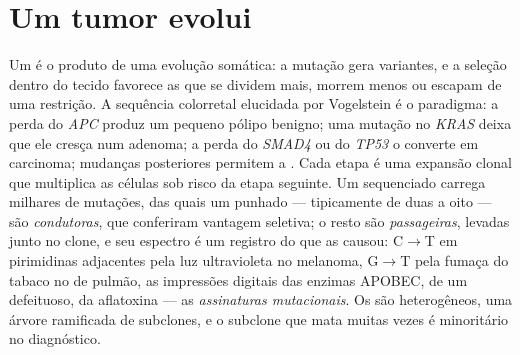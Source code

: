 \section{Um tumor evolui}

\begin{proposition}\label{prop:b3:cancer-biology:multistep}
Um  é o produto de uma evolução somática: a mutação gera
variantes, e a seleção dentro do tecido favorece as que se dividem
mais, morrem menos ou escapam de uma restrição. A sequência colorretal
elucidada por Vogelstein é o paradigma: a perda do \emph{APC} produz um
pequeno pólipo benigno; uma mutação no \emph{KRAS} deixa que ele cresça
num adenoma; a perda do \emph{SMAD4} ou do \emph{TP53} o converte em
carcinoma; mudanças posteriores permitem a . Cada etapa é uma
expansão clonal que multiplica as células sob risco da etapa seguinte.
Um  sequenciado carrega milhares de mutações, das quais um punhado
--- tipicamente de duas a oito --- são \emph{condutoras}, que
conferiram vantagem seletiva; o resto são \emph{passageiras}, levadas
junto no clone, e seu espectro é um registro do que as causou: C$\to$T
em pirimidinas adjacentes pela luz ultravioleta no melanoma, G$\to$T
pela fumaça do tabaco no  de pulmão, as impressões digitais das
enzimas APOBEC, de um  defeituoso, da
aflatoxina --- as \emph{assinaturas mutacionais}. Os  são
heterogêneos, uma árvore ramificada de subclones, e o subclone que mata
muitas vezes é minoritário no diagnóstico.
\end{proposition}

